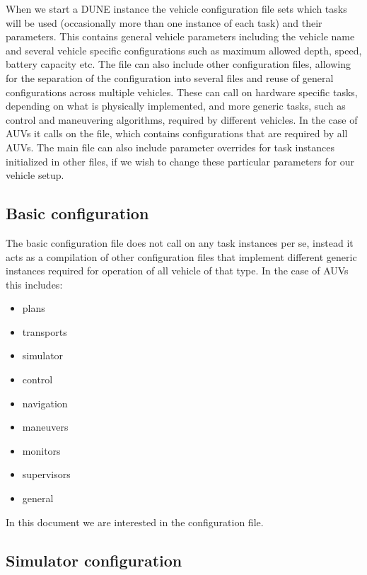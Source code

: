 \documentclass[10pt,a4paper]{article}
\begin{document}
\par When we start a DUNE instance the vehicle configuration file sets which tasks will be used (occasionally more than one instance of each task) and their parameters. This contains general vehicle parameters including the vehicle name and several vehicle specific configurations such as maximum allowed depth, speed, battery capacity etc. The file can also include other configuration files, allowing for the separation of the configuration into several files and reuse of general configurations across multiple vehicles. These can call on hardware specific tasks, depending on what is physically implemented, and more generic tasks, such as control and maneuvering algorithms, required by different vehicles. In the case of AUVs it calls on the  file, which contains configurations that are required by all AUVs. The main file can also include parameter overrides for task instances initialized in other files, if we wish to change these particular parameters for our vehicle setup.

\subsection{Basic configuration}

\par The basic configuration file does not call on any task instances per se, instead it acts as a compilation of other configuration files that implement different generic instances required for operation of all vehicle of that type. In the case of AUVs this includes:

\begin{itemize}
\item plans
\item transports
\item simulator
\item control
\item navigation
\item maneuvers
\item monitors
\item supervisors
\item general
\end{itemize}

In this document we are interested in the  configuration file.

\subsection{Simulator configuration}
\end{document}

